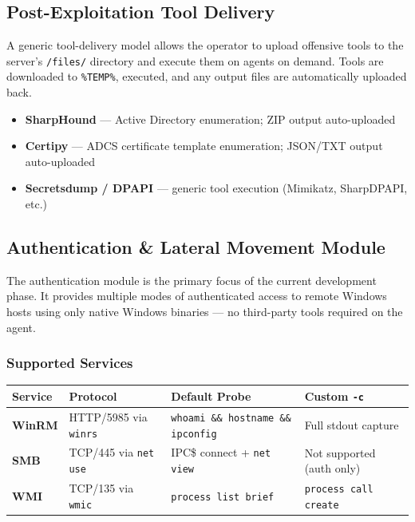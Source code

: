 \documentclass[11pt,a4paper]{article}
\newcommand{\theadrow}{\rowcolor{dark}\color{white}\bfseries}
\begin{document}
\subsection{Post-Exploitation Tool Delivery}

A generic tool-delivery model allows the operator to upload offensive tools to the server's \texttt{/files/} directory and execute them on agents on demand. Tools are downloaded to \texttt{\%TEMP\%}, executed, and any output files are automatically uploaded back.

\begin{itemize}[leftmargin=16pt, itemsep=2pt]
    \item \textbf{SharpHound} --- Active Directory enumeration; ZIP output auto-uploaded
    \item \textbf{Certipy} --- ADCS certificate template enumeration; JSON/TXT output auto-uploaded
    \item \textbf{Secretsdump / DPAPI} --- generic tool execution (Mimikatz, SharpDPAPI, etc.)
\end{itemize}

\subsection{Authentication \& Lateral Movement Module}

The authentication module is the primary focus of the current development phase. It provides multiple modes of authenticated access to remote Windows hosts using only native Windows binaries --- no third-party tools required on the agent.

\subsubsection{Supported Services}

\vspace{4pt}
\begin{tabularx}{\linewidth}{L{1.8cm} L{4cm} L{4.2cm} X}
\toprule
\theadrow Service & Protocol & Default Probe & Custom \texttt{-c} \\
\midrule
\textbf{WinRM} & HTTP/5985 via \texttt{winrs}    & \texttt{whoami \&\& hostname \&\& ipconfig} & Full stdout capture \\
\textbf{SMB}   & TCP/445 via \texttt{net use}    & IPC\$ connect + \texttt{net view}           & Not supported (auth only) \\
\textbf{WMI}   & TCP/135 via \texttt{wmic}       & \texttt{process list brief}                 & \texttt{process call create} \\
\bottomrule
\end{tabularx}
\end{document}
